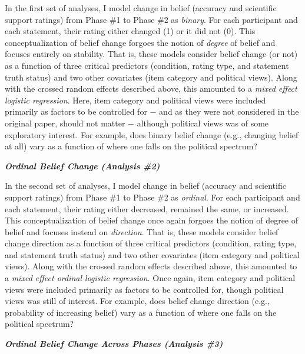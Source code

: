 \documentclass[12pt]{article}  %
\begin{document}
In the first set of analyses, I model change in belief (accuracy and scientific support ratings) from Phase \#1 to Phase \#2 as \textit{binary}. For each participant and each statement, their rating either changed (1) or it did not (0). This conceptualization of belief change forgoes the notion of \textit{degree} of belief and focuses entirely on stability. That is, these models consider belief change (or not) as a function of three critical predictors (condition, rating type, and statement truth status) and two other covariates (item category and political views). Along with the crossed random effects described above, this amounted to a \textit{mixed effect logistic regression}. Here, item category and political views were included primarily as factors to be controlled for $-$ and as they were not considered in the original paper, should not matter $-$ although political views was of some exploratory interest. For example, does binary belief change (e.g., changing belief at all) vary as a function of where one falls on the political spectrum?

\noindent\textbf{\textit{Ordinal Belief Change (Analysis \#2)}}

In the second set of analyses, I model change in belief (accuracy and scientific support ratings) from Phase \#1 to Phase \#2 as \textit{ordinal}. For each participant and each statement, their rating either decreased, remained the same, or increased. This conceptualization of belief change once again forgoes the notion of degree of belief and focuses instead on \textit{direction}. That is, these models consider belief change direction as a function of three critical predictors (condition, rating type, and statement truth status) and two other covariates (item category and political views). Along with the crossed random effects described above, this amounted to a \textit{mixed effect ordinal logistic regression}. Once again, item category and political views were included primarily as factors to be controlled for, though political views was still of interest. For example, does belief change direction (e.g., probability of increasing belief) vary as a function of where one falls on the political spectrum?

\noindent\textbf{\textit{Ordinal Belief Change Across Phases (Analysis \#3)}}
\end{document}
